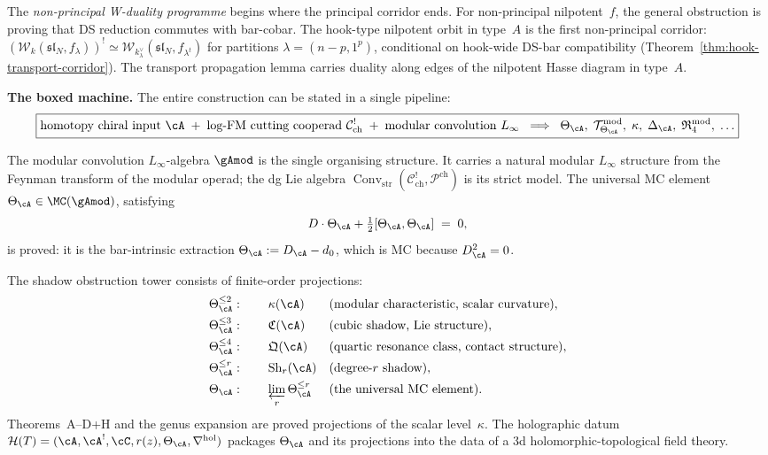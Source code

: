 The \emph{non-principal W-duality programme} begins where the principal
corridor ends. For non-principal nilpotent~$f$, the general obstruction
is proving that DS reduction commutes with bar-cobar. The hook-type
nilpotent orbit in type~$A$ is the first non-principal corridor:
$(\mathcal W_k(\mathfrak{sl}_N,f_\lambda))^!\simeq
\mathcal W_{k^\vee_\lambda}(\mathfrak{sl}_N,f_{\lambda^t})$ for
partitions $\lambda=(n-p,1^p)$, conditional on hook-wide DS-bar
compatibility (Theorem~\ref{thm:hook-transport-corridor}). The
transport propagation lemma carries duality along edges of the
nilpotent Hasse diagram in type~$A$.

\bigskip

\noindent\textbf{The boxed machine.}
The entire construction can be stated in a single pipeline:
\[
\boxed{
\text{homotopy chiral input }\cA
\;+\;
\text{log-FM cutting cooperad }\mathcal C^!_{\mathrm{ch}}
\;+\;
\text{modular convolution }L_\infty
\;\;\Longrightarrow\;\;
\Theta_\cA,\;
\mathcal T^{\mathrm{mod}}_{\Theta_\cA},\;
\kappa,\;
\Delta_\cA,\;
\mathfrak R^{\mathrm{mod}}_4,\;\ldots
}
\]

\noindent
The modular convolution $L_\infty$-algebra
$\gAmod$ is the single organising structure.
It carries a natural modular $L_\infty$ structure from the Feynman
transform of the modular operad; the dg Lie algebra
$\operatorname{Conv}_{\mathrm{str}}(\mathcal C^!_{\mathrm{ch}},
\mathcal P^{\mathrm{ch}})$ is its strict model. The universal MC
element
$\Theta_\cA\in\MC(\gAmod)$,
satisfying
\[
D\cdot\Theta_\cA+\tfrac12[\Theta_\cA,\Theta_\cA]\;=\;0,
\]
is proved: it is the bar-intrinsic extraction
$\Theta_\cA:=D_\cA-d_0$, which is MC because $D_\cA^2=0$.

The shadow obstruction tower consists of finite-order projections:
\begin{align*}
\Theta_\cA^{\le 2}&:\qquad\kappa(\cA)
 &&\text{(modular characteristic, scalar curvature)},\\
\Theta_\cA^{\le 3}&:\qquad\mathfrak C(\cA)
 &&\text{(cubic shadow, Lie structure)},\\
\Theta_\cA^{\le 4}&:\qquad\mathfrak Q(\cA)
 &&\text{(quartic resonance class, contact structure)},\\
\Theta_\cA^{\le r}&:\qquad\operatorname{Sh}_r(\cA)
 &&\text{(degree-$r$ shadow)},\\
\Theta_\cA&:\qquad\varprojlim_r\Theta_\cA^{\le r}
 &&\text{(the universal MC element)}.
\end{align*}
Theorems~A--D+H and the genus expansion are proved projections
of the scalar level~$\kappa$. The holographic datum
$\mathcal H(T)=(\cA,\cA^!,\cC,r(z),\Theta_\cA,\nabla^{\mathrm{hol}})$
packages $\Theta_\cA$ and its projections into the data of a 3d
holomorphic-topological field theory.


